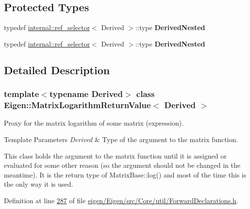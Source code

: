 \subsection*{Protected Types}
\begin{DoxyCompactItemize}
\item 
\mbox{\label{class_eigen_1_1_matrix_logarithm_return_value_a18e69d2302e53d0ab0ebcfceda3f64ae}} 
typedef \hyperlink{struct_eigen_1_1internal_1_1ref__selector}{internal\+::ref\+\_\+selector}$<$ Derived $>$\+::type {\bfseries Derived\+Nested}
\item 
\mbox{\label{class_eigen_1_1_matrix_logarithm_return_value_a18e69d2302e53d0ab0ebcfceda3f64ae}} 
typedef \hyperlink{struct_eigen_1_1internal_1_1ref__selector}{internal\+::ref\+\_\+selector}$<$ Derived $>$\+::type {\bfseries Derived\+Nested}
\end{DoxyCompactItemize}


\subsection{Detailed Description}
\subsubsection*{template$<$typename Derived$>$\newline
class Eigen\+::\+Matrix\+Logarithm\+Return\+Value$<$ Derived $>$}

Proxy for the matrix logarithm of some matrix (expression). 


\begin{DoxyTemplParams}{Template Parameters}
{\em Derived} & Type of the argument to the matrix function.\\
\hline
\end{DoxyTemplParams}
This class holds the argument to the matrix function until it is assigned or evaluated for some other reason (so the argument should not be changed in the meantime). It is the return type of Matrix\+Base\+::log() and most of the time this is the only way it is used. 

Definition at line \hyperlink{eigen_2_eigen_2src_2_core_2util_2_forward_declarations_8h_source_l00287}{287} of file \hyperlink{eigen_2_eigen_2src_2_core_2util_2_forward_declarations_8h_source}{eigen/\+Eigen/src/\+Core/util/\+Forward\+Declarations.\+h}.



